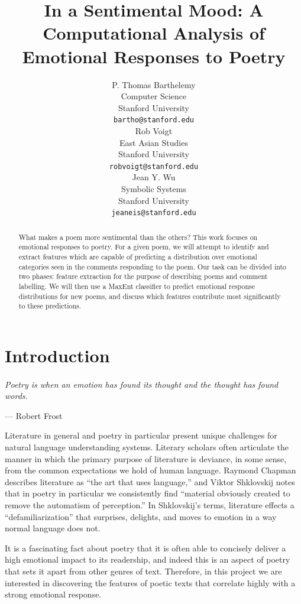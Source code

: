 \documentclass[11pt]{article}
\title{In a Sentimental Mood: A Computational Analysis of Emotional Responses to Poetry}
\author{P. Thomas Barthelemy \\
  Computer Science\\
  Stanford University \\
  {\tt bartho@stanford.edu} \\\And
  Rob Voigt \\
  East Asian Studies \\
  Stanford University \\
  {\tt robvoigt@stanford.edu} \\\And
  Jean Y. Wu \\
  Symbolic Systems  \\
  Stanford University\\
  {\tt jeaneis@stanford.edu} \\}
\date{}
\begin{document}
\maketitle
\begin{abstract}
What makes a poem more sentimental than the others? 
This work focuses on emotional responses to poetry. For a given poem, we will attempt to identify and extract features which are capable of predicting a distribution over emotional categories seen in the comments responding to the poem. Our task can be divided into two phases: feature extraction for the purpose of describing poems and comment labelling. We will then use a MaxEnt classifier to predict emotional response distributions for new poems, and discuss which features contribute most significantly to these predictions.
\end{abstract}

\section{Introduction}

\paragraph{}
\emph{Poetry is when an emotion has found its thought and the thought has found words.}
\begin{flushright}
--- Robert Frost\\
\end{flushright}


Literature in general and poetry in particular present unique challenges for natural language understanding systems. Literary scholars often articulate the manner in which the primary purpose of literature is deviance, in some sense, from the common expectations we hold of human language. Raymond Chapman describes literature as ``the art that uses language,'' and Viktor Shklovskij notes that in poetry in particular we consistently find ``material obviously created to remove the automatism of perception.'' In Shklovskij's terms, literature effects a ``defamiliarization'' that surprises, delights, and moves to emotion in a way normal language does not.

It is a fascinating fact about poetry that it is often able to concisely deliver a high emotional impact to its readership, and indeed this is an aspect of poetry that sets it apart from other genres of text. Therefore, in this project we are interested in discovering the features of poetic texts that correlate highly with a strong emotional response.
\end{document}
